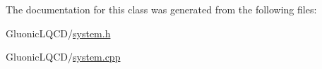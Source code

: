 The documentation for this class was generated from the following files\+:\begin{DoxyCompactItemize}
\item 
Gluonic\+L\+Q\+C\+D/\mbox{\hyperlink{system_8h}{system.\+h}}\item 
Gluonic\+L\+Q\+C\+D/\mbox{\hyperlink{system_8cpp}{system.\+cpp}}\end{DoxyCompactItemize}
